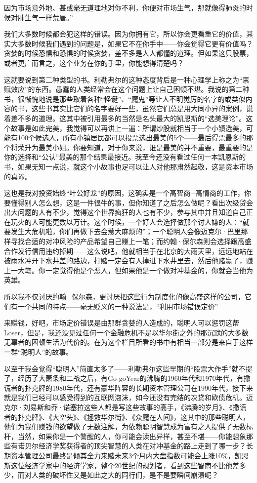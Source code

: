 因为市场意外地、甚或毫无道理地对你不利，你便对市场生气，那就像得肺炎的时候对肺生气一样荒唐。''

我们大多数时候都会犯这样的错误。因为你拥有它，所以你会更看重它的价值，其实大多数时候我们遇到的问题是，如果它不在你手中------你会觉得它更有价值吗？贪婪的时候恐惧和恐惧的时候贪婪，差不多是人人都懂的道理。但如果这只股票，或者更广而言之，这个业务在你的手里，你能想得清楚吗？

这就要说到第二种类型的书。利勒弗尔的这种态度背后是一种心理学上称之为``禀赋效应''的东西。愚蠢的人类经常会在这个问题上让自己困顿不堪。我说的第二种书，很惭愧地说是那些取着各种``怪诞''、``魔鬼''等让人不明觉厉的名字的或类似内容的书，这些书其实比它们的名字要好一些，虽然它们总是用大同小异的案例，说着差不多的道理。这其中被引用最多的当然是名头最大的凯恩斯的``选美理论''。这个故事是如此完美，我觉得可以再讲上一遍：所谓炒股就相当于一个小镇选美，可能有100个候选人，所有小镇居民都可以投票选出最美的5个------最后得票最多的那个将荣升为最美小姐。你要知道，对于你来说，谁是最美的并不重要，最重要的是你的选择和``公认''最美的那个结果最接近。我至今还没有看过任何一本凯恩斯的书，如果无知一点说，就这个小故事也足可以让人对他那肃然起敬，这是资本市场的真谛。

这也是我对投资始终``叶公好龙''的原因，这确实是一个高智商+高情商的工作，你要懂得别人怎么想，这是一件很牛的事，但你知道了之后怎么做呢？看出次级贷会出大问题的人有不少，觉得这个世界疯狂的人也有不少，参与其中并且知道自己正在玩火的人可能更数以万计。这个时候，一个好人会选择做那个讨人嫌的人：``就要发生大危机啦，你们再做下去会惹大麻烦的''；一个聪明人会像迈克尔·巴里那样寻找合适的对冲风险的产品希望自己赚上一笔；而约翰·保尔森则会选择跟高盛合作发行信用违约掉期------这么说吧，他就相当于在北京的大雨天里，远远地站在被雨水冲开下水井盖的路边，打赌一定会有人掉进下水井里去，然后他赌赢了，赚上一大笔。你一定觉得他是个恶人，但如果他是一个做对冲基金的，你就会当他为英雄。

所以我不仅讨厌约翰·保尔森，更讨厌把这些行为制度化的像高盛这样的公司，它们有一个共同的特点------毫无贬义的一种说法是，``利用市场错误定价''

来赚钱，好吧，市场定价错误是由那群贪婪的人造成的，聪明人可以惩罚这帮Loser，但是，我还没见过任何一个金融危机不是以华尔街之外的那沉默的大多数无辜者的困顿生活为代价的。在为这个栏目所看的书中有相当一部分是来自于这样一群``聪明人''的故事。

以至于我会觉得``聪明人''简直太多了------利勒弗尔这些早期的``股票大作手''就不提了，经历了大萧条和二战之后，有Go-goYear的沸腾的1960年代和1970年代，有撒谎者的扑克牌的1980年代，还有豪华阵容的长期资本管理公司在1990年代，接下来就是我们已经可以感受得到的互联网泡沫，如今还没有完结的次贷和欧债危机。迈克尔·刘易斯和乔·诺塞拉这些人都是写这些故事的高手，《沸腾的岁月》、《撒谎者的扑克牌》、《大空头》、《拯救华尔街》、《众魔在人间》，这其中的那些聪明人，他们为我们赚钱的欲望做了无数注解，为依赖聪明智慧成为富有之人提供了无数标杆，当然，如果你是一个警醒的人，你可能会读出异样，甚至不堪------你能想象那些有诺贝尔经济学奖获得者的顶尖智慧的人类在对冲基金的路上走到了哪一步？长期资本管理公司最终是倾其全力来赌未来3个月内大盘指数可能会上涨10\%，凯恩斯这位经济学家中的经济学家，整个20世纪的规划者，看到这些智商不比他差多少，而对人类的破坏性又是如此之大的同行们，是不是要瞬间崩溃呢？

